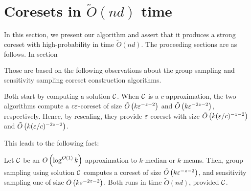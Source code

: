 \section{Coresets in $\tilde{O}(nd)$ time}

In this section, we present our algorithm and assert that it produces a strong coreset with high-probability in time $\tilde{O}(nd)$.
The proceeding sections are as follows. In section

Those are based on the following observations about the group
sampling \cite{stoc21} and sensitivity sampling \cite{FeldmanL11} coreset construction algorithms.

Both start by computing a solution $\mathcal C$. When $\mathcal C$ is a $c$-approximation, the two algorithms compute a $c \varepsilon$-coreset of size $\tilde O\left(
k \varepsilon^{-z-2}\right)$ and $\tilde O\left( k \varepsilon^{-2z -2}\right)$, respectively. Hence, by rescaling, they provide $\varepsilon$-coreset with size $\tilde O\left(
k (\varepsilon/c)^{-z-2}\right)$ and $\tilde O\left( k (\varepsilon/c)^{-2z-2}\right)$. 

This leads to the following fact:
\begin{fact}\label{fact:logApprox}
Let $\mathcal C$ be an $O\left( \log^{O(1)} k\right)$ approximation to $k$-median or $k$-means.
Then, group sampling using solution $\mathcal C$ computes a coreset of size $\tilde O\left(
k \varepsilon^{-z-2}\right)$, and sensitivity sampling one of size $\tilde O\left( k \varepsilon^{-2z-2}\right)$. 
Both runs in time $\tilde O(nd)$, provided $\mathcal C$.
\end{fact}

%

